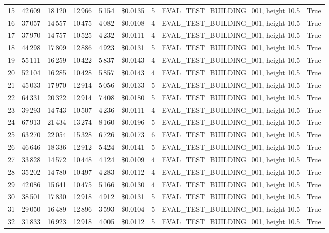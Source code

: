 \documentclass[a4paper,11pt]{article}
\begin{document}
\begin{table}[ht]
\begin{tabular}{r r r r r r r p{3cm} l}
15 & 42\,609 & 18\,120 & 12\,966 & 5\,154 & \$0.0135 & 5 & EVAL\_TEST\_BUILDING\_001, height 10.5 & True \\
16 & 37\,057 & 14\,557 & 10\,475 & 4\,082 & \$0.0108 & 4 & EVAL\_TEST\_BUILDING\_001, height 10.5 & True \\
17 & 37\,970 & 14\,757 & 10\,525 & 4\,232 & \$0.0111 & 4 & EVAL\_TEST\_BUILDING\_001, height 10.5 & True \\
18 & 44\,298 & 17\,809 & 12\,886 & 4\,923 & \$0.0131 & 5 & EVAL\_TEST\_BUILDING\_001, height 10.5 & True \\
19 & 55\,111 & 16\,259 & 10\,422 & 5\,837 & \$0.0143 & 4 & EVAL\_TEST\_BUILDING\_001, height 10.5 & True \\
20 & 52\,104 & 16\,285 & 10\,428 & 5\,857 & \$0.0143 & 4 & EVAL\_TEST\_BUILDING\_001, height 10.5 & True \\
21 & 45\,033 & 17\,970 & 12\,914 & 5\,056 & \$0.0133 & 5 & EVAL\_TEST\_BUILDING\_001, height 10.5 & True \\
22 & 64\,331 & 20\,322 & 12\,914 & 7\,408 & \$0.0180 & 5 & EVAL\_TEST\_BUILDING\_001, height 10.5 & True \\
23 & 39\,293 & 14\,743 & 10\,507 & 4\,236 & \$0.0111 & 4 & EVAL\_TEST\_BUILDING\_001, height 10.5 & True \\
24 & 67\,913 & 21\,434 & 13\,274 & 8\,160 & \$0.0196 & 5 & EVAL\_TEST\_BUILDING\_001, height 10.5 & True \\
25 & 63\,270 & 22\,054 & 15\,328 & 6\,726 & \$0.0173 & 6 & EVAL\_TEST\_BUILDING\_001, height 10.5 & True \\
26 & 46\,646 & 18\,336 & 12\,912 & 5\,424 & \$0.0141 & 5 & EVAL\_TEST\_BUILDING\_001, height 10.5 & True \\
27 & 33\,828 & 14\,572 & 10\,448 & 4\,124 & \$0.0109 & 4 & EVAL\_TEST\_BUILDING\_001, height 10.5 & True \\
28 & 35\,202 & 14\,780 & 10\,497 & 4\,283 & \$0.0112 & 4 & EVAL\_TEST\_BUILDING\_001, height 10.5 & True \\
29 & 42\,086 & 15\,641 & 10\,475 & 5\,166 & \$0.0130 & 4 & EVAL\_TEST\_BUILDING\_001, height 10.5 & True \\
30 & 38\,501 & 17\,830 & 12\,918 & 4\,912 & \$0.0131 & 5 & EVAL\_TEST\_BUILDING\_001, height 10.5 & True \\
31 & 29\,050 & 16\,489 & 12\,896 & 3\,593 & \$0.0104 & 5 & EVAL\_TEST\_BUILDING\_001, height 10.5 & True \\
32 & 31\,833 & 16\,923 & 12\,918 & 4\,005 & \$0.0112 & 5 & EVAL\_TEST\_BUILDING\_001, height 10.5 & True \\

\end{tabular}
\end{table}
\end{document}
